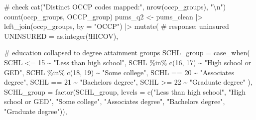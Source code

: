 \documentclass[
  letterpaper,
  DIV=11,
  numbers=noendperiod]{scrartcl}
\newenvironment{Shaded}{\begin{snugshade}}{\end{snugshade}}
\newcommand{\AttributeTok}[1]{\textcolor[rgb]{0.40,0.45,0.13}{#1}}
\newcommand{\CommentTok}[1]{\textcolor[rgb]{0.37,0.37,0.37}{#1}}
\newcommand{\DecValTok}[1]{\textcolor[rgb]{0.68,0.00,0.00}{#1}}
\newcommand{\FunctionTok}[1]{\textcolor[rgb]{0.28,0.35,0.67}{#1}}
\newcommand{\NormalTok}[1]{\textcolor[rgb]{0.00,0.23,0.31}{#1}}
\newcommand{\OtherTok}[1]{\textcolor[rgb]{0.00,0.23,0.31}{#1}}
\newcommand{\SpecialCharTok}[1]{\textcolor[rgb]{0.37,0.37,0.37}{#1}}
\newcommand{\StringTok}[1]{\textcolor[rgb]{0.13,0.47,0.30}{#1}}
\begin{document}
\begin{Shaded}
\begin{Highlighting}[]
\CommentTok{\# check}
\FunctionTok{cat}\NormalTok{(}\StringTok{"Distinct OCCP codes mapped:"}\NormalTok{, }\FunctionTok{nrow}\NormalTok{(occp\_groups), }\StringTok{"}\SpecialCharTok{\textbackslash{}n}\StringTok{"}\NormalTok{)}
\FunctionTok{count}\NormalTok{(occp\_groups, OCCP\_group)}
\NormalTok{pums\_q2 }\OtherTok{\textless{}{-}}\NormalTok{ pums\_clean }\SpecialCharTok{|\textgreater{}}
  \FunctionTok{left\_join}\NormalTok{(occp\_groups, }\AttributeTok{by =} \StringTok{"OCCP"}\NormalTok{) }\SpecialCharTok{|\textgreater{}}
  \FunctionTok{mutate}\NormalTok{(}
    \CommentTok{\# response: uninsured}
    \AttributeTok{UNINSURED =} \FunctionTok{as.integer}\NormalTok{(}\SpecialCharTok{!}\NormalTok{HICOV),}

    \CommentTok{\# education collapsed to degree attainment groups}
    \AttributeTok{SCHL\_group =} \FunctionTok{case\_when}\NormalTok{(}
\NormalTok{      SCHL }\SpecialCharTok{\textless{}=} \DecValTok{15}           \SpecialCharTok{\textasciitilde{}} \StringTok{"Less than high school"}\NormalTok{,}
\NormalTok{      SCHL }\SpecialCharTok{\%in\%} \FunctionTok{c}\NormalTok{(}\DecValTok{16}\NormalTok{, }\DecValTok{17}\NormalTok{) }\SpecialCharTok{\textasciitilde{}} \StringTok{"High school or GED"}\NormalTok{,}
\NormalTok{      SCHL }\SpecialCharTok{\%in\%} \FunctionTok{c}\NormalTok{(}\DecValTok{18}\NormalTok{, }\DecValTok{19}\NormalTok{) }\SpecialCharTok{\textasciitilde{}} \StringTok{"Some college"}\NormalTok{,}
\NormalTok{      SCHL }\SpecialCharTok{==} \DecValTok{20}           \SpecialCharTok{\textasciitilde{}} \StringTok{"Associate\textquotesingle{}s degree"}\NormalTok{,}
\NormalTok{      SCHL }\SpecialCharTok{==} \DecValTok{21}           \SpecialCharTok{\textasciitilde{}} \StringTok{"Bachelor\textquotesingle{}s degree"}\NormalTok{,}
\NormalTok{      SCHL }\SpecialCharTok{\textgreater{}=} \DecValTok{22}           \SpecialCharTok{\textasciitilde{}} \StringTok{"Graduate degree"}
\NormalTok{    ),}
    \AttributeTok{SCHL\_group =} \FunctionTok{factor}\NormalTok{(SCHL\_group,}
                        \AttributeTok{levels =} \FunctionTok{c}\NormalTok{(}\StringTok{"Less than high school"}\NormalTok{, }\StringTok{"High school or GED"}\NormalTok{,}
                                   \StringTok{"Some college"}\NormalTok{, }\StringTok{"Associate\textquotesingle{}s degree"}\NormalTok{,}
                                   \StringTok{"Bachelor\textquotesingle{}s degree"}\NormalTok{, }\StringTok{"Graduate degree"}\NormalTok{)),}


\end{Highlighting}
\end{Shaded}
\end{document}
